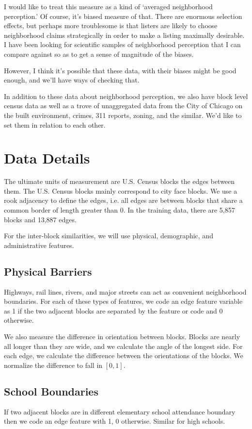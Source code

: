 \documentclass[12pt,letter]{article}\usepackage[]{graphicx}\usepackage[]{color}
\begin{document}
I would like to treat this measure as a kind of `averaged neighborhood
perception.' Of course, it's biased measure of that. There are
enormous selection effects, but perhaps more troublesome is that
listers are likely to choose neighborhood claims strategically in
order to make a listing maximally desirable. I have been looking for
scientific samples of neighborhood perception that I can compare
against so as to get a sense of magnitude of the biases.

However, I think it's possible that these data, with their biases
might be good enough, and we'll have ways of checking that. 

In addition to these data about neighborhood perception, we also have
block level census data as well as a trove of unaggregated data from
the City of Chicago on the built environment, crimes, 311 reports,
zoning, and the similar. We'd like to set them in relation to each
other.

\section*{Data Details}
The ultimate units of measurement are U.S. Census blocks the edges
between them. The U.S. Census blocks mainly correspond to city face
blocks. We use a rook adjacency to define the edges, i.e. all edges
are between blocks that share a common border of length greater than
0. In the training data, there are 5,857 blocks and
  13,887 edges.

For the inter-block similarities, we will use physical, demographic,
and administrative features.

\subsection*{Physical Barriers}
Highways, rail lines, rivers, and major streets can act as convenient
neighborhood boundaries. For each of these types of features, we code
an edge feature variable as 1 if the two adjacent blocks are separated
by the feature or code and 0 otherwise.

We also measure the difference in orientation between blocks. Blocks
are nearly all longer than they are wide, and we calculate the angle
of the longest side. For each edge, we calculate the difference
between the orientations of the blocks. We normalize the difference to
fall in $[0,1]$. 

\subsection*{School Boundaries}
If two adjacent blocks are in different elementary school attendance
boundary then we code an edge feature with 1, 0 otherwise. Similar for
high schools.
\end{document}
